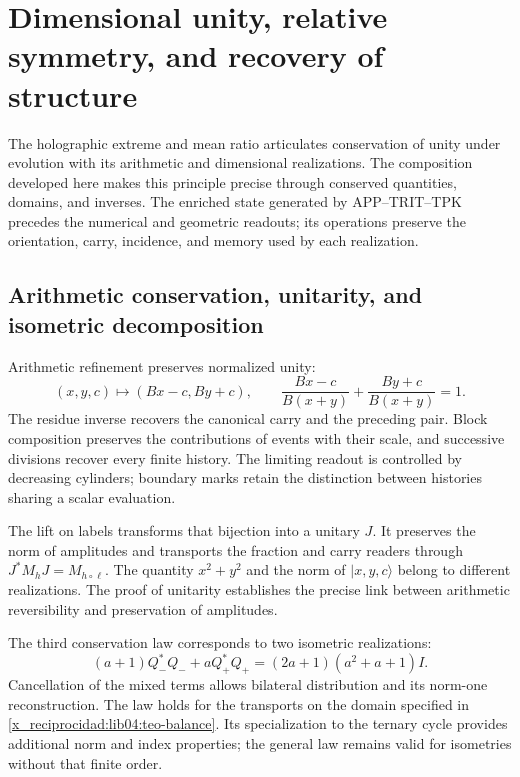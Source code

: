 \chapter{Dimensional unity, relative symmetry, and recovery of structure}
\label{x_reciprocidad:lib06:sintesis}

The holographic extreme and mean ratio articulates conservation of unity
under evolution with its arithmetic and dimensional realizations. The
composition developed here makes this principle precise through
conserved quantities, domains, and inverses. The enriched state
generated by APP--TRIT--TPK precedes the numerical and
geometric readouts; its operations preserve the orientation, carry,
incidence, and memory used by each realization.

\section{Arithmetic conservation, unitarity, and isometric decomposition}
\label{x_reciprocidad:lib06:tres-conservaciones}

Arithmetic refinement preserves normalized unity:
\begin{equation}
 (x,y,c)\longmapsto(Bx-c,By+c),\qquad
 \frac{Bx-c}{B(x+y)}+\frac{By+c}{B(x+y)}=1.
 \label{x_reciprocidad:lib06:unidad}
\end{equation}
The residue inverse recovers the canonical carry and the preceding
pair. Block composition preserves the contributions of
events with their scale, and successive divisions recover every
finite history. The limiting readout is controlled by decreasing
cylinders; boundary marks retain the distinction between
histories sharing a scalar evaluation.

The lift on labels transforms that bijection into a
unitary \(J\). It preserves the norm of amplitudes and transports
the fraction and carry readers through
\(J^*M_hJ=M_{h\circ\ell}\). The quantity \(x^2+y^2\) and the norm
of \(|x,y,c\rangle\) belong to different realizations. The
proof of unitarity establishes the precise link between arithmetic
reversibility and preservation of amplitudes.

The third conservation law corresponds to two isometric realizations:
\begin{equation}
 (a+1)Q_-^*Q_-+aQ_+^*Q_+
 =(2a+1)(a^2+a+1)I.
 \label{x_reciprocidad:lib06:balance}
\end{equation}
Cancellation of the mixed terms allows bilateral
distribution and its norm-one reconstruction. The law holds for the
transports on the domain specified in
\cref{x_reciprocidad:lib04:teo-balance}. Its specialization to the ternary cycle
provides additional norm and index properties; the general law
remains valid for isometries without that finite order.

